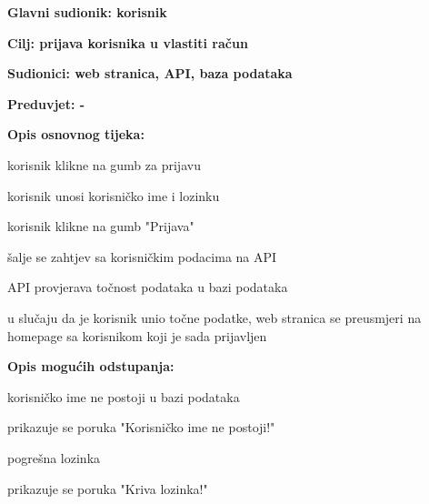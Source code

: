				
					\noindent {}
					\begin{packed_item}
						\item \textbf{Glavni sudionik: korisnik}
						\item  \textbf{Cilj: prijava korisnika u vlastiti račun}
						\item  \textbf{Sudionici: web stranica, API, baza podataka}
						\item  \textbf{Preduvjet: -}
						
						\item  \textbf{Opis osnovnog tijeka:}
						\item[] \begin{packed_enum}
							\item korisnik klikne na gumb za prijavu
							\item korisnik unosi korisničko ime i lozinku
							\item korisnik klikne na gumb "Prijava"
							\item šalje se zahtjev sa korisničkim podacima na API
							\item API provjerava točnost podataka u bazi podataka
							\item u slučaju da je korisnik unio točne podatke, web stranica se preusmjeri na homepage sa korisnikom koji je sada prijavljen
						\end{packed_enum}
						
						\item  \textbf{Opis mogućih odstupanja:}
						\item[] \begin{packed_item}
							\item[2.a] korisničko ime ne postoji u bazi podataka
							\begin{packed_enum}
								\item prikazuje se poruka "Korisničko ime ne postoji!"
							\end{packed_enum}
							\item[2.b] pogrešna lozinka
							\begin{packed_enum}
								\item prikazuje se poruka "Kriva lozinka!"
							\end{packed_enum}
						\end{packed_item}
					\end{packed_item}


